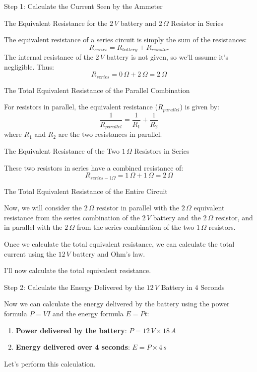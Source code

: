 Step 1: Calculate the Current Seen by the Ammeter

The Equivalent Resistance for the \(2\,V\) battery and \(2\,\Omega\) Resistor in Series

The equivalent resistance of a series circuit is simply the sum of the resistances:
\[ R_{series} = R_{battery} + R_{resistor} \]
The internal resistance of the \(2\,V\) battery is not given, so we'll assume it's negligible. Thus:
\[ R_{series} = 0\,\Omega + 2\,\Omega = 2\,\Omega \]

The Total Equivalent Resistance of the Parallel Combination

For resistors in parallel, the equivalent resistance (\(R_{parallel}\)) is given by:
\[ \frac{1}{R_{parallel}} = \frac{1}{R_1} + \frac{1}{R_2} \]
where \(R_1\) and \(R_2\) are the two resistances in parallel.

The Equivalent Resistance of the Two \(1\,\Omega\) Resistors in Series

These two resistors in series have a combined resistance of:
\[ R_{series-1\Omega} = 1\,\Omega + 1\,\Omega = 2\,\Omega \]

The Total Equivalent Resistance of the Entire Circuit

Now, we will consider the \(2\,\Omega\) resistor in parallel with the \(2\,\Omega\) equivalent resistance from the series combination of the \(2\,V\) battery and the \(2\,\Omega\) resistor, and in parallel with the \(2\,\Omega\) from the series combination of the two \(1\,\Omega\) resistors.

Once we calculate the total equivalent resistance, we can calculate the total current using the \(12\,V\) battery and Ohm's law.

I'll now calculate the total equivalent resistance.

Step 2: Calculate the Energy Delivered by the \(12\,V\) Battery in \(4\) Seconds

Now we can calculate the energy delivered by the battery using the power formula \(P = VI\) and the energy formula \(E = Pt\):

\begin{enumerate}
  \item \textbf{Power delivered by the battery}: \(P = 12\,V \times 18\,A\)
  \item \textbf{Energy delivered over 4 seconds}: \(E = P \times 4\,s\)
\end{enumerate}

Let's perform this calculation.

